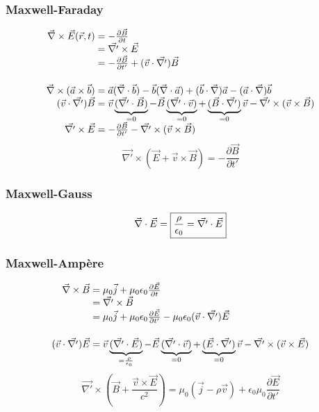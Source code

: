 \subsubsection*{Maxwell-Faraday}
$$
	\begin{array}{r@{\;}l}
		\nab\times\vec{E}(\vec{r},t)&=-\frac{\partial \vec{B}}{\partial t}\\
			&=\vec{\nabla '}\times\vec{E}\\
			&=-\frac{\partial \vec{B}}{\partial t'} + (\vec{v}\cdot\vec{\nabla '})\vec{B}\\[15pt]
		\nab\times(\vec{a}\times\vec{b})&=\vec{a}(\nab\cdot\vec{b})
				-\vec{b}(\nab\cdot\vec{a})
				+(\vec{b}\cdot\nab)\vec{a}
				-(\vec{a}\cdot\nab)\vec{b}\\
		(\vec{v}\cdot\vec{\nabla '})\vec{B} & = \vec{v}\underbrace{(\vec{\nabla '}\cdot\vec{B})}_{=0}
				-\vec{B}\underbrace{(\vec{\nabla '}\cdot\vec{v})}_{=0}
				+\underbrace{(\vec{B}\cdot\vec{\nabla '})}_{=0} \vec{v}
				-\vec{\nabla '}\times(\vec{v}\times\vec{B})\\
		\vec{\nabla '}\times\vec{E}&=-\frac{\partial \vec{B}}{\partial t'}-\vec{\nabla '}\times(\vec{v}\times\vec{B})
	\end{array}
$$
$$
	\boxed{\vec{\nabla '}\times(\vec{E}+\vec{v}\times\vec{B})=-\frac{\partial \vec{B}}{\partial t'}}	
$$
\subsubsection*{Maxwell-Gauss}
$$
	\vec{\nabla}\cdot\vec{E}=\boxed{\frac{\rho}{\epsilon_0}=\vec{\nabla '}\cdot\vec{E}}
$$

\subsubsection*{Maxwell-Ampère}
$$
	\begin{array}{r@{\;}l}
		\nab\times\vec{B}&=\mu_0\vec{j}+\mu_0\epsilon_0\frac{\partial \vec{E}}{\partial t}\\
			&=\vec{\nabla '}\times\vec{B}\\
			&=\mu_0\vec{j}+\mu_0\epsilon_0\frac{\partial \vec{E}}{\partial t'}-\mu_0\epsilon_0(\vec{v}\cdot\vec{\nabla '})\vec{E}\\[15pt]
		(\vec{v}\cdot\vec{\nabla '})\vec{E}& = \vec{v} \underbrace{(\vec{\nabla '}\cdot\vec{E})}_{=\frac{\rho}{\epsilon_0}}
				- \vec{E} \underbrace{(\vec{\nabla '}\cdot\vec{v})}_{=0}
				+ \underbrace{(\vec{E}\cdot\vec{\nabla '})}_{=0} \vec{v}
				- \vec{\nabla '}\times(\vec{v}\times\vec{E})
	\end{array}
$$
$$
	\boxed{\vec{\nabla '}\times(\vec{B}+\frac{\vec{v}\times\vec{E}}{c^2})=\mu_0(\vec{j}-\rho\vec{v})+\epsilon_0\mu_0\frac{\partial \vec{E}}{\partial t'}}	
$$

